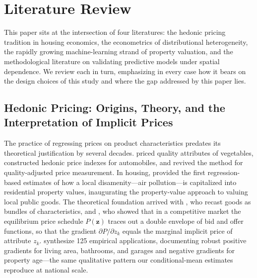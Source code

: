%
\section{Literature Review}
\label{sec:literature}

This paper sits at the intersection of four literatures: the hedonic pricing
tradition in housing economics, the econometrics of distributional heterogeneity,
the rapidly growing machine-learning strand of property valuation, and the
methodological literature on validating predictive models under spatial dependence.
We review each in turn, emphasizing in every case how it bears on the design choices
of this study and where the gap addressed by this paper lies.

\subsection{Hedonic Pricing: Origins, Theory, and the Interpretation of Implicit Prices}

The practice of regressing prices on product characteristics predates its
theoretical justification by several decades. \citet{waugh1928quality} priced
quality attributes of vegetables, \citet{court1939hedonic} constructed hedonic
price indexes for automobiles, and \citet{griliches1961hedonic} revived the method
for quality-adjusted price measurement. In housing, \citet{ridker1967determinants}
provided the first regression-based estimates of how a local disamenity---air
pollution---is capitalized into residential property values, inaugurating the
property-value approach to valuing local public goods. The theoretical foundation
arrived with \citet{lancaster1966new}, who recast goods as bundles of
characteristics, and \citet{rosen1974hedonic}, who showed that in a competitive
market the equilibrium price schedule $P(\mathbf{z})$ traces out a double envelope
of bid and offer functions, so that the gradient $\partial P/\partial z_k$ equals
the marginal implicit price of attribute $z_k$. \citet{sirmans2005composition}
synthesize 125 empirical applications, documenting robust positive gradients for
living area, bathrooms, and garages and negative gradients for property age---the
same qualitative pattern our conditional-mean estimates reproduce at national scale.

